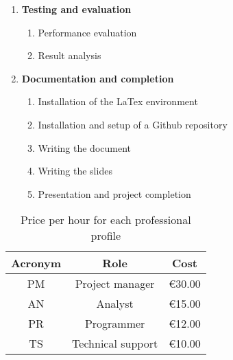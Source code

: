 \begin{enumerate}
\begin{enumerate}
  \end{enumerate}
  \item \textbf{Testing and evaluation}
  \begin{enumerate}
    \item Performance evaluation
    \item Result analysis
  \end{enumerate}
  \item \textbf{Documentation and completion}
  \begin{enumerate}
    \item{Installation of the LaTex environment}
    \item{Installation and setup of a Github repository}
    \item{Writing the document}
    \item{Writing the slides}
    \item{Presentation and project completion} 
  \end{enumerate} 
\end{enumerate}

\begin{table}[htbp]
\caption{Price per hour for each professional profile}
\begin{center}
\begin{tabular}{|c|c|c|}
\hline
\textbf{Acronym} & \textbf{Role} & \textbf{Cost} \\ \hline
PM & Project manager & \textgreek{\euro}30.00 \\ \hline
AN & Analyst & \textgreek{\euro}15.00 \\ \hline
PR & Programmer & \textgreek{\euro}12.00 \\ \hline
TS & Technical support & \textgreek{\euro}10.00 \\ \hline
\end{tabular}
\end{center}
\label{prices}
\end{table}








